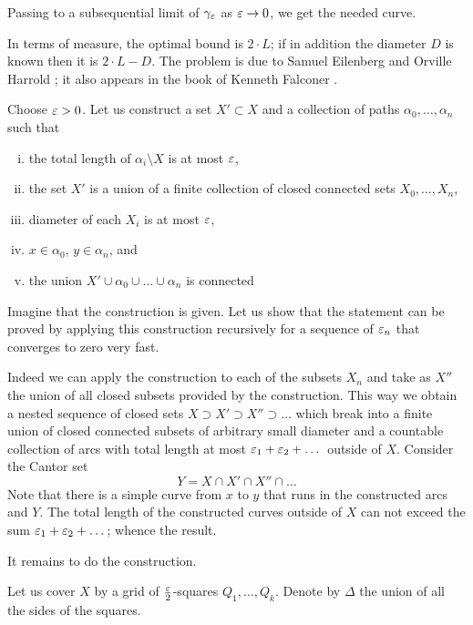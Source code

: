 Passing to a subsequential limit of $\gamma_\varepsilon$ as $\varepsilon\to 0$,
we get the needed curve. \qeds

In terms of measure, the optimal bound is $2\cdot L$;
if in addition the diameter $D$ is known then it is $2\cdot L-D$.
The problem is due to 
Samuel Eilenberg 
and Orville Harrold 
\cite{eilenberg-harrold};
it also appears in the book of Kenneth Falconer \cite[see Exercise 3.5 in][]{falconer}.


Choose $\varepsilon>0$.
Let us construct a set $X'\subset X$ 
 and a collection of paths $\alpha_0,\dots,\alpha_n$ such that 
\begin{enumerate}[(i)]
\item the total length of $\alpha_i\setminus X$ is at most $\varepsilon$,
\item the set $X'$ is a union of a finite collection of closed connected sets $X_0,\dots,X_n$,
\item diameter of each $X_i$ is at most $\varepsilon$,
\item $x\in\alpha_0$, $y\in\alpha_n$, and
\item the union $X'\cup \alpha_0\cup\dots\cup\alpha_n$ is connected
\end{enumerate}

Imagine that the construction is given.
Let us show that the statement can be proved by applying this construction recursively for a sequence of $\varepsilon_n$ that converges to zero very fast.

Indeed we can apply the construction to each of the subsets $X_n$ and take as $X''$ the union of all closed subsets provided by the construction.
This way we obtain a nested sequence of closed sets $X\supset X'\supset X''\supset\dots$ which break into a finite union of closed connected subsets of arbitrary small diameter and a countable collection of arcs with total length at most $\varepsilon_1+\varepsilon_2+\dots$ 
outside of $X$.
Consider the Cantor set 
\[Y= X\cap  X'\cap X''\cap\dots\]
Note that there is a simple curve from $x$ to $y$ that runs in the constructed arcs and $Y$.
The total length of the constructed curves outside of $X$ can not exceed the sum
$\varepsilon_1+\varepsilon_2+\dots$;
whence the result.

It remains to do the construction.

Let us cover $X$ by a grid of $\tfrac{\varepsilon}2$-squares $Q_1,\dots,Q_k$.
Denote by $\Delta$ the union of all the sides of the squares.

